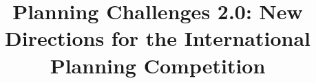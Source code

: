 \documentclass[letterpaper]{article}
\begin{document}
\title{Planning Challenges 2.0: New Directions for the International
Planning Competition}
\author{}

\maketitle









\end{document}
